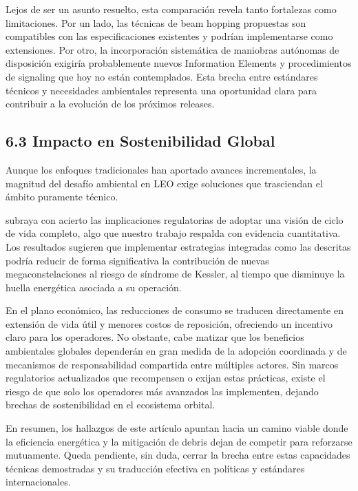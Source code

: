 Lejos de ser un asunto resuelto, esta comparación revela tanto fortalezas como limitaciones. Por un lado, las técnicas de beam hopping propuestas son compatibles con las especificaciones existentes y podrían implementarse como extensiones. Por otro, la incorporación sistemática de maniobras autónomas de disposición exigiría probablemente nuevos Information Elements y procedimientos de signaling que hoy no están contemplados. Esta brecha entre estándares técnicos y necesidades ambientales representa una oportunidad clara para contribuir a la evolución de los próximos releases.

\subsection{6.3 Impacto en Sostenibilidad Global}

Aunque los enfoques tradicionales han aportado avances incrementales, la magnitud del desafío ambiental en LEO exige soluciones que trasciendan el ámbito puramente técnico. 

\cite{Bennett2025} subraya con acierto las implicaciones regulatorias de adoptar una visión de ciclo de vida completo, algo que nuestro trabajo respalda con evidencia cuantitativa. Los resultados sugieren que implementar estrategias integradas como las descritas podría reducir de forma significativa la contribución de nuevas megaconstelaciones al riesgo de síndrome de Kessler, al tiempo que disminuye la huella energética asociada a su operación.

En el plano económico, las reducciones de consumo se traducen directamente en extensión de vida útil y menores costos de reposición, ofreciendo un incentivo claro para los operadores. No obstante, cabe matizar que los beneficios ambientales globales dependerán en gran medida de la adopción coordinada y de mecanismos de responsabilidad compartida entre múltiples actores. Sin marcos regulatorios actualizados que recompensen o exijan estas prácticas, existe el riesgo de que solo los operadores más avanzados las implementen, dejando brechas de sostenibilidad en el ecosistema orbital.

En resumen, los hallazgos de este artículo apuntan hacia un camino viable donde la eficiencia energética y la mitigación de debris dejan de competir para reforzarse mutuamente. Queda pendiente, sin duda, cerrar la brecha entre estas capacidades técnicas demostradas y su traducción efectiva en políticas y estándares internacionales.